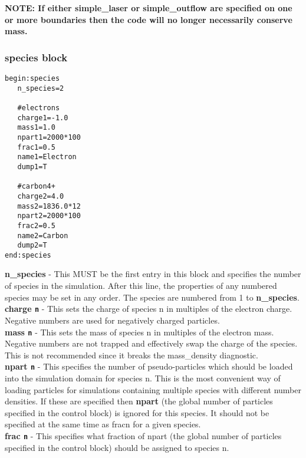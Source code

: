 \documentclass[12pt]{article}
\newcommand{\emphtext}{\color{warwickdark} \fontfamily{phv}\selectfont\Large\bf}
\newcommand{\inlineemph}{\color{warwicklight} \bf}
\newcommand{\boxverbatim}[1]{\begin{Verbatim}[obeytabs=true,frame=single,
  framerule=0.5mm,rulecolor=\color{warwickmid},label=#1]}
\newcommand{\inlinecode}[1]{{\color{warwickred} \bf\texttt{#1}}}
\begin{document}
{\emphtext NOTE: If either simple\_laser or simple\_outflow are specified on
one or more boundaries then the code will no longer necessarily conserve mass.}

\pagebreak

\subsubsection{{\inlineemph species} block}

\boxverbatim{species block}
begin:species
   n_species=2

   #electrons
   charge1=-1.0
   mass1=1.0
   npart1=2000*100
   frac1=0.5
   name1=Electron
   dump1=T

   #carbon4+
   charge2=4.0
   mass2=1836.0*12
   npart2=2000*100
   frac2=0.5
   name2=Carbon
   dump2=T
end:species
\end{Verbatim}

{\emphtext n\_species} - This MUST be the first entry in this block and
specifies the number of species in the simulation. After this line, the
properties of any numbered species may be set in any order. The species are
numbered from 1 to {\inlineemph n\_species}.\\

{\emphtext charge\inlinecode{n}} - This sets the charge of species n in
multiples of the electron charge. Negative numbers are used for negatively
charged particles.\\

{\emphtext mass\inlinecode{n}} - This sets the mass of species n in multiples
of the electron mass. Negative numbers are not trapped and effectively swap the
charge of the species. This is not recommended since it breaks the
mass\_density diagnostic.\\

{\emphtext npart\inlinecode{n}} - This specifies the number of pseudo-particles
which should be loaded into the simulation domain for species n. This is the
most convenient way of loading particles for simulations containing multiple
species with different number densities. If these are specified then
{\inlineemph npart} (the global number of particles specified in the control
block) is ignored for this species. It should not be specified at the same time
as fracn for a given species.\\

{\emphtext frac\inlinecode{n}} - This specifies what fraction of npart (the
global number of particles specified in the control block) should be assigned
to species n. \\
\end{document}

